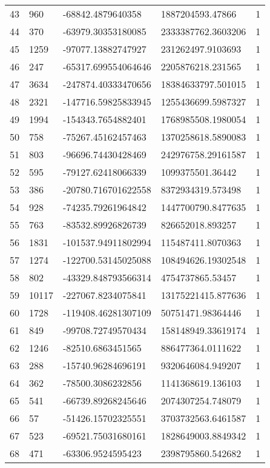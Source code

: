 \begin{longtable}{lllll}
    43 & 960 & -68842.4879640358 & 1887204593.47866 & 1 \\
    44 & 370 & -63979.30353180085 & 2333387762.3603206 & 1 \\
    45 & 1259 & -97077.13882747927 & 231262497.9103693 & 1 \\
    46 & 247 & -65317.699554064646 & 2205876218.231565 & 1 \\
    47 & 3634 & -247874.40333470656 & 18384633797.501015 & 1 \\
    48 & 2321 & -147716.59825833945 & 1255436699.5987327 & 1 \\
    49 & 1994 & -154343.7654882401 & 1768985508.1980054 & 1 \\
    50 & 758 & -75267.45162457463 & 1370258618.5890083 & 1 \\
    51 & 803 & -96696.74430428469 & 242976758.29161587 & 1 \\
    52 & 595 & -79127.62418066339 & 1099375501.36442 & 1 \\
    53 & 386 & -20780.716701622558 & 8372934319.573498 & 1 \\
    54 & 928 & -74235.79261964842 & 1447700790.8477635 & 1 \\
    55 & 763 & -83532.89926826739 & 826652018.893257 & 1 \\
    56 & 1831 & -101537.94911802994 & 115487411.8070363 & 1 \\
    57 & 1274 & -122700.53145025088 & 108494626.19302548 & 1 \\
    58 & 802 & -43329.848793566314 & 4754737865.53457 & 1 \\
    59 & 10117 & -227067.8234075841 & 13175221415.877636 & 1 \\
    60 & 1728 & -119408.46281307109 & 50751471.98364446 & 1 \\
    61 & 849 & -99708.72749570434 & 158148949.33619174 & 1 \\
    62 & 1246 & -82510.6863451565 & 886477364.0111622 & 1 \\
    63 & 288 & -15740.96284696191 & 9320646084.949207 & 1 \\
    64 & 362 & -78500.3086232856 & 1141368619.136103 & 1 \\
    65 & 541 & -66739.89268245646 & 2074307254.748079 & 1 \\
    66 & 57 & -51426.15702325551 & 3703732563.6461587 & 1 \\
    67 & 523 & -69521.75031680161 & 1828649003.8849342 & 1 \\
    68 & 471 & -63306.9524595423 & 2398795860.542682 & 1 \\

\end{longtable}
